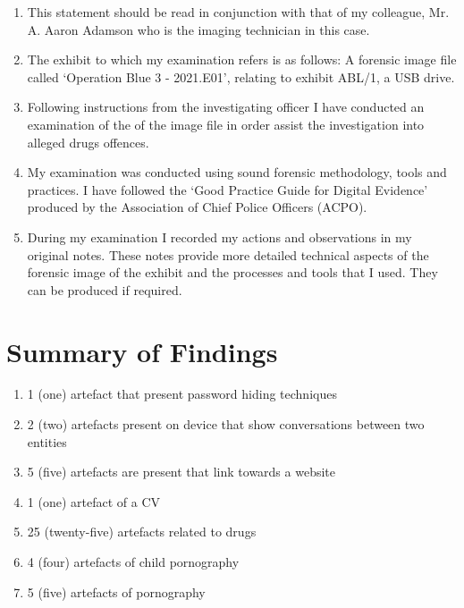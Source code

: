 \documentclass[11pt]{article}
\begin{document}
\begin{enumerate}[resume]
    \item This statement should be read in conjunction with that of my colleague, Mr. A. Aaron Adamson who is the imaging technician in this case.
    \item The exhibit to which my examination refers is as follows: A forensic image file called ‘Operation Blue 3 - 2021.E01’, relating to exhibit ABL/1, a USB drive.
    \item Following instructions from the investigating officer I have conducted an examination of the of the image file in order assist the investigation into alleged drugs offences.
    \item My examination was conducted using sound forensic methodology, tools and practices. I have followed the ‘Good Practice Guide for Digital Evidence’ produced by the Association of Chief Police Officers (ACPO).
    \item During my examination I recorded my actions and observations in my original notes. These notes provide more detailed technical aspects of the forensic image of the exhibit and the processes and tools that I used. They can be produced if required.
\end{enumerate}

\section*{Summary of Findings}
\begin{enumerate}[resume]
    \item 1 (one) artefact that present password hiding techniques
    \item 2 (two) artefacts present on device that show conversations between two entities
    \item 5 (five) artefacts are present that link towards a website
    \item 1 (one) artefact of a CV
    \item 25 (twenty-five) artefacts related to drugs
    \item 4 (four) artefacts of child pornography
    \item 5 (five) artefacts of pornography
\end{enumerate}
\end{document}

